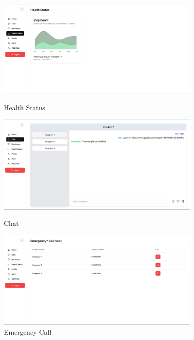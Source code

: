 \begin{figure}
    \centering
    \begin{minipage}{\textwidth}
        \centering
        \includegraphics[width=0.9\textwidth]{health data.png}
        \caption{Health Status}
        \label{fig:health_status}
    \end{minipage}
    \vspace{5pt}
    \begin{minipage}{\textwidth}
        \centering
        \includegraphics[width=0.9\textwidth]{chat.png}
        \caption{Chat}
        \label{fig:chat}
    \end{minipage}
    \vspace{5pt}
    \begin{minipage}{\textwidth}
        \centering
        \includegraphics[width=0.9\textwidth]{emergency contact.png}
        \caption{Emergency Call}
        \label{fig:emergency_call}
    \end{minipage}
    \vspace{5pt}
\end{figure}